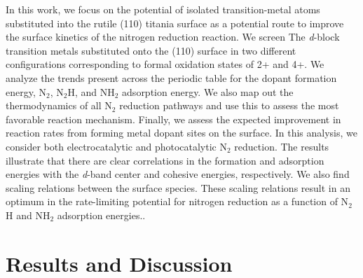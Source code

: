 In this work, we focus on the potential of isolated transition-metal atoms substituted into the rutile (110) titania surface as a potential route to improve the surface kinetics of the nitrogen reduction reaction. We screen The \textit{d}-block transition metals substituted onto the (110) surface in two different configurations corresponding to formal oxidation states of 2+ and 4+. 
We analyze the trends present across the periodic table for the dopant formation energy, N$_2$, N$_2$H, and NH$_2$ adsorption energy. We also map out the thermodynamics of all N$_2$ reduction pathways and use this to assess the most favorable reaction mechanism. Finally, we assess the expected improvement in reaction rates from forming metal dopant sites on the surface. In this analysis, we consider both electrocatalytic and photocatalytic N$_2$ reduction. The results illustrate that there are clear correlations in the formation and adsorption energies with the \textit{d}-band center and cohesive energies, respectively. We also find scaling relations between the surface species. These scaling relations result in an optimum in the rate-limiting potential for nitrogen reduction as a function of N$_2$H and NH$_2$ adsorption energies.. %

\section{Results and Discussion}

